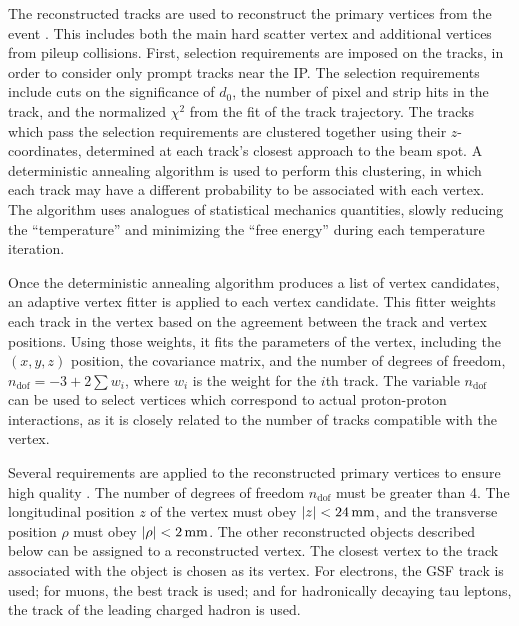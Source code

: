 \documentclass[12pt]{thesis}  %
\begin{document}
The reconstructed tracks are used to reconstruct the primary vertices from the event \cite{TrackingJINST}. This includes both the main hard scatter vertex and additional vertices from pileup collisions. First, selection requirements are imposed on the tracks, in order to consider only prompt tracks near the IP. The selection requirements include cuts on the significance of $d_0$, the number of pixel and strip hits in the track, and the normalized $\chi^2$ from the fit of the track trajectory. The tracks which pass the selection requirements are clustered together using their $z$-coordinates, determined at each track's closest approach to the beam spot. A deterministic annealing algorithm is used to perform this clustering, in which each track may have a different probability to be associated with each vertex. The algorithm uses analogues of statistical mechanics quantities, slowly reducing the ``temperature'' and minimizing the ``free energy'' during each temperature iteration.

Once the deterministic annealing algorithm produces a list of vertex candidates, an adaptive vertex fitter is applied to each vertex candidate. This fitter weights each track in the vertex based on the agreement between the track and vertex positions. Using those weights, it fits the parameters of the vertex, including the $(x,y,z)$ position, the covariance matrix, and the number of degrees of freedom, $n_{\text{dof}} = -3 + 2 \sum{w_i}$, where $w_i$ is the weight for the $i$th track. The variable $n_{\text{dof}}$ can be used to select vertices which correspond to actual proton-proton interactions, as it is closely related to the number of tracks compatible with the vertex.

Several requirements are applied to the reconstructed primary vertices to ensure high quality \cite{CMS-PAS-TRK-10-005}. The number of degrees of freedom $n_{\text{dof}}$ must be greater than 4. The longitudinal position $z$ of the vertex must obey $|z|<24\,\text{mm}$, and the transverse position $\rho$ must obey $|\rho|<2\,\text{mm}$. The other reconstructed objects described below can be assigned to a reconstructed vertex. The closest vertex to the track associated with the object is chosen as its vertex. For electrons, the GSF track is used; for muons, the best track is used; and for hadronically decaying tau leptons, the track of the leading charged hadron is used.

\end{document}
